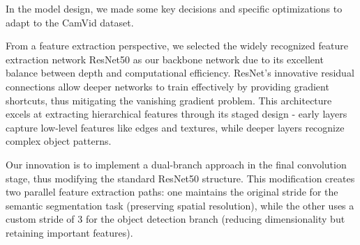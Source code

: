 \documentclass[conference]{IEEEtran}
\begin{document}



In the model design, we made some key decisions and specific optimizations to adapt to the CamVid dataset.

From a feature extraction perspective, we selected the widely recognized feature extraction network ResNet50 as our backbone network due to its excellent balance between depth and computational efficiency. ResNet's innovative residual connections allow deeper networks to train effectively by providing gradient shortcuts, thus mitigating the vanishing gradient problem. This architecture excels at extracting hierarchical features through its staged design - early layers capture low-level features like edges and textures, while deeper layers recognize complex object patterns.

Our innovation is to implement a dual-branch approach in the final convolution stage, thus modifying the standard ResNet50 structure. This modification creates two parallel feature extraction paths: one maintains the original stride for the semantic segmentation task (preserving spatial resolution), while the other uses a custom stride of 3 for the object detection branch (reducing dimensionality but retaining important features).


\end{document}

